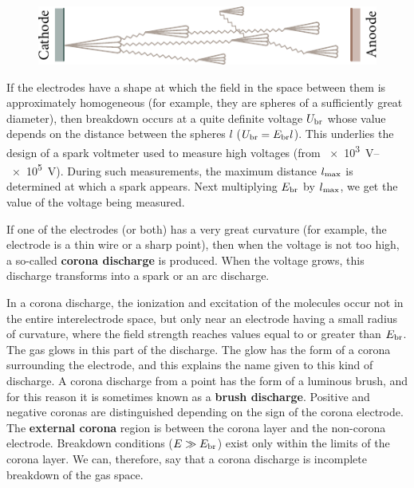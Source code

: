 \begin{figure}[t]
	\begin{center}
		\includegraphics[scale=1]{figures/ch_12/fig_12_10.pdf}
		\caption[]{}
		\label{fig:12_10}
	\end{center}
	\vspace{-0.8cm}
\end{figure}

If the electrodes have a shape at which the field in the space between them is approximately homogeneous (for example, they are spheres of a sufficiently great diameter), then breakdown occurs at a quite definite voltage $U_{\text{br}}$ whose value depends on the distance between the spheres $l$ ($U_{\text{br}} = E_{\text{br}}l$).
This underlies the design of a spark voltmeter used to measure high voltages (from \SIrange{e3}{e5}{\volt}).
During such measurements, the maximum distance $l_{\text{max}}$ is determined at which a spark appears.
Next multiplying $E_{\text{br}}$ by $l_{\text{max}}$, we get the value of the voltage being measured.

If one of the electrodes (or both) has a very great curvature (for example, the electrode is a thin wire or a sharp point), then when the voltage is not too high, a so-called \textbf{corona discharge} is produced.
When the voltage grows, this discharge transforms into a spark or an arc discharge.

In a corona discharge, the ionization and excitation of the molecules occur not in the entire interelectrode space, but only near an electrode having a small radius of curvature, where the field strength reaches values equal to or greater than $E_{\text{br}}$.
The gas glows in this part of the discharge.
The glow has the form of a corona surrounding the electrode, and this explains the name given to this kind of discharge.
A corona discharge from a point has the form of a luminous brush, and for this reason it is sometimes known as a \textbf{brush discharge}.
Positive and negative coronas are distinguished depending on the sign of the corona electrode.
The \textbf{external corona} region is between the corona layer and the non-corona electrode.
Breakdown conditions ($E\gg E_{\text{br}}$) exist only within the limits of the corona layer.
We can, therefore, say that a corona discharge is incomplete breakdown of the gas space.

